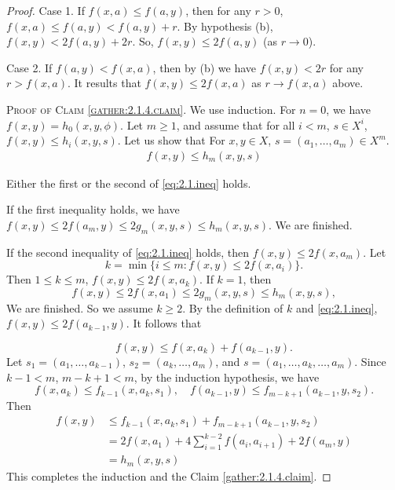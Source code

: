 \documentclass[main.tex]{subfiles}
\begin{document}
\begin{proof}
Case 1. If $f(x, a) \le f(a, y)$, then for any $r >0$, $f(x, a) \le f(a, y) <   f(a, y) + r$. 
By hypothesis (b), $f(x, y) < 2 f(a, y)+2r$. So, $f(x, y) \le 2 f(a, y)$ (as  $r \rightarrow 0$).

Case 2. If $f(a, y) < f(x, a)$, then by (b) we have $f(x, y) < 2 r$ for any $r > f(x, a)$.
It results that $f(x, y) \le 2f(x, a)$ as  $r \rightarrow f(x, a)$ above.

\vspace{8pt}
\noindent\textsc{Proof of Claim \eqref{gather:2.1.4.claim}}. We use induction. For $n=0$, 
we have $f(x, y) = h_0(x, y, \phi)$. 
Let $m \ge 1$, and assume that for all $i < m$, 
$s\in X^i$, $f(x, y) \le h_i(x, y, s)$. Let us show that %
For $x, y \in X$, $s = (a_{1}, \dots, a_{m})\in X^m$.
\begin{gather}
	f(x, y) \le h_{m}(x, y, s)
\end{gather}

Either the first or the second of \eqref{eq:2.1.ineq} holds. 

If the first inequality holds, we have
$f(x, y) \le 2 f(a_{m}, y) \le 2 g_{m}(x, y, s) \le h_{m}(x, y, s)$. We are finished.

If the second inequality of  \eqref{eq:2.1.ineq} holds, then $f(x, y) \le 2 f(x, a_{m})$. 
Let 
$$k = \min \{i \le m: f(x, y) \le 2 f(x, a_{i})\}.$$
Then $1 \le k \le m$, $f(x, y) \le 2 f(x, a_{k})$. If $k = 1$, then 
$$f(x, y) \le 2 f(x, a_{1}) \le 2 g_{m}(x, y, s) \le h_{m}(x, y, s),$$
We are finished. 
So we assume $k \ge 2$. By the definition of $k$ and \eqref{eq:2.1.ineq}, 
$f(x, y) \le 2 f(a_{k-1}, y)$. It follows that

$$f(x, y) \le f(x, a_{k}) + f(a_{k-1}, y).$$
Let $s_{1} = (a_{1}, \dots, a_{k-1})$, $s_{2} = (a_{k}, \dots, a_{m})$, and $s = (a_{1}, \dots, a_{k}, \dots, a_{m})$. Since $k - 1 < m$, $m - k + 1 < m$, by the induction hypothesis, we have
$$f(x, a_{k}) \le f_{k-1}(x, a_{k}, s_{1}), \quad
f(a_{k-1}, y) \le f_{m-k+1}(a_{k-1}, y, s_{2}).$$
Then 
\begin{equation*}
	\begin{aligned}
f(x, y)    &\le f_{k-1}(x, a_{k}, s_{1}) + f_{m-k+1}(a_{k-1}, y, s_{2}) \\
              &= 2 f(x, a_{1}) + 4 \sum_{i=1}^{k-2} f(a_{i}, a_{i+1}) + 2 f(a_{m}, y) \\
	          &= h_{m}(x, y, s)
	 \end{aligned}
\end{equation*}
This completes the induction and the Claim \eqref{gather:2.1.4.claim}.
\end{proof}
\end{document}
